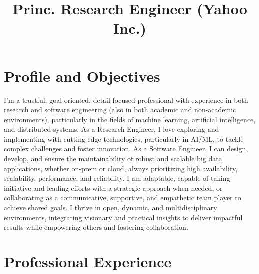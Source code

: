 \documentclass[10pt,a4paper,english]{moderncv}      %
\title{Princ. Research Engineer (Yahoo Inc.)}               %
\begin{document}
\maketitle
\vspace{-1cm}

\section{Profile and Objectives}
\small I’m a trustful, goal-oriented, detail-focused professional with experience in both research and 
software engineering (also in both academic and non-academic environments), particularly in the fields of 
machine learning, artificial intelligence, and distributed systems. As a Research Engineer, I love 
exploring and implementing with cutting-edge technologies, particularly in AI/ML, to tackle complex 
challenges and foster innovation. As a Software Engineer, I can design, develop, and ensure the maintainability 
of robust and scalable big data applications, whether on-prem or cloud, always prioritizing high availability, 
scalability, performance, and reliability. I am adaptable, capable of taking initiative and leading efforts 
with a strategic approach when needed, or collaborating as a communicative, supportive, and empathetic team 
player to achieve shared goals. I thrive in open, dynamic, and multidisciplinary environments, integrating 
visionary and practical insights to deliver impactful results while empowering others and fostering collaboration.

\section{Professional Experience}


\end{document}

